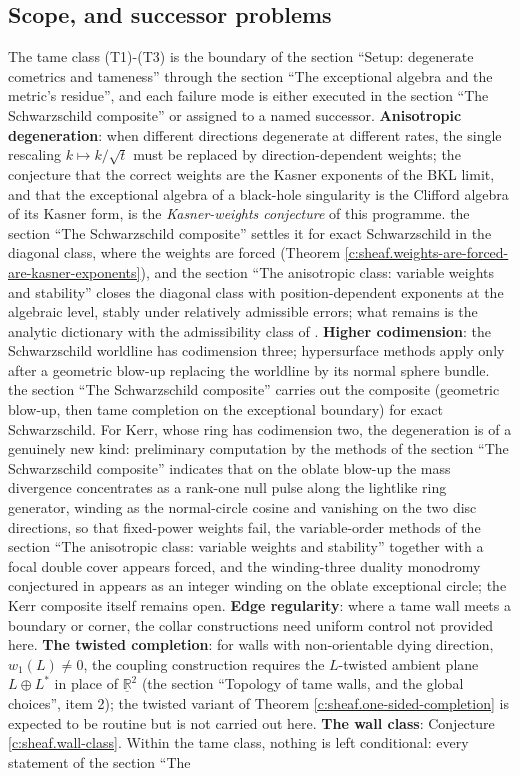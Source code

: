 \documentclass[11pt]{article}
\theoremstyle{definition}
\theoremstyle{plain}
\providecommand{\R}{}\renewcommand{\R}{\mathbb{R}}
\providecommand{\shL}{}\renewcommand{\shL}{L}
\begin{document}
\subsection*{Scope, and successor problems}
\label{c:note.sheaf.setting-scope-successor-problems}
The tame class (T1)-(T3) is the boundary of the section ``Setup: degenerate cometrics and tameness'' through the section ``The exceptional algebra and the metric's residue'', and each failure mode is either executed in the section ``The Schwarzschild composite'' or assigned to a named successor. \textbf{Anisotropic degeneration}: when different directions degenerate at different rates, the single rescaling $k \mapsto k/\sqrt t$ must be replaced by direction-dependent weights; the conjecture that the correct weights are the Kasner exponents of the BKL limit, and that the exceptional algebra of a black-hole singularity is the Clifford algebra of its Kasner form, is the \emph{Kasner-weights conjecture} of this programme. the section ``The Schwarzschild composite'' settles it for exact Schwarzschild in the diagonal class, where the weights are forced (Theorem \ref{c:sheaf.weights-are-forced-are-kasner-exponents}), and the section ``The anisotropic class: variable weights and stability'' closes the diagonal class with position-dependent exponents at the algebraic level, stably under relatively admissible errors; what remains is the analytic dictionary with the admissibility class of \cite{ButlerT6}. \textbf{Higher codimension}: the Schwarzschild worldline has codimension three; hypersurface methods apply only after a geometric blow-up replacing the worldline by its normal sphere bundle. the section ``The Schwarzschild composite'' carries out the composite (geometric blow-up, then tame completion on the exceptional boundary) for exact Schwarzschild. For Kerr, whose ring has codimension two, the degeneration is of a genuinely new kind: preliminary computation by the methods of the section ``The Schwarzschild composite'' indicates that on the oblate blow-up the mass divergence concentrates as a rank-one null pulse along the lightlike ring generator, winding as the normal-circle cosine and vanishing on the two disc directions, so that fixed-power weights fail, the variable-order methods of the section ``The anisotropic class: variable weights and stability'' together with a focal double cover appears forced, and the winding-three duality monodromy conjectured in \cite{ButlerT6} appears as an integer winding on the oblate exceptional circle; the Kerr composite itself remains open. \textbf{Edge regularity}: where a tame wall meets a boundary or corner, the collar constructions need uniform control not provided here. \textbf{The twisted completion}: for walls with non-orientable dying direction, $w_1(\shL) \neq 0$, the coupling construction requires the $\shL$-twisted ambient plane $\shL \oplus \shL^*$ in place of $\underline{\R}^2$ (the section ``Topology of tame walls, and the global choices'', item 2); the twisted variant of Theorem \ref{c:sheaf.one-sided-completion} is expected to be routine but is not carried out here. \textbf{The wall class}: Conjecture \ref{c:sheaf.wall-class}. Within the tame class, nothing is left conditional: every statement of the section ``The 
\end{document}
